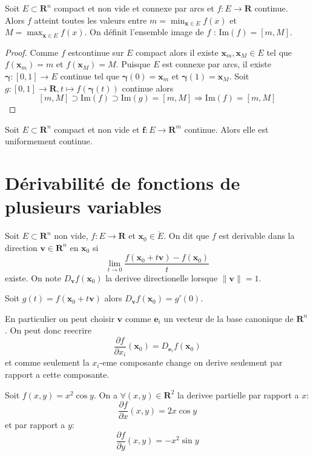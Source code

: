 \begin{theorem}
Soit $E\subset \mathbf{R}^{n}$ compact et non vide et connexe par arcs et $f:E\to \mathbf{R}$ continue. Alors $f$ atteint toutes les valeurs entre $m=\min_{\boldsymbol{x}\in E} f(x)$ et $M=\max_{\boldsymbol{x}\in E} f(x)$. On définit l'ensemble image de $f$ : $\mathrm{Im}(f)=[m,M]$.
\end{theorem}
\begin{proof}
Comme $f$ estcontinue sur $E$ compact alors il existe $\boldsymbol{x}_{m},\boldsymbol{x}_{M}\in E$ tel que $f(\boldsymbol{x}_{m})=m$ et $f(\boldsymbol{x}_{M})=M$. Puisque $E$ est connexe par arcs, il existe $\boldsymbol{\gamma}:[0,1]\to E$ continue tel que $\boldsymbol{\gamma}(0)=\boldsymbol{x}_{m}$ et $\boldsymbol{\gamma}(1)=\boldsymbol{x}_{M}$. Soit $g:[0,1]\to \mathbf{R}, t\mapsto f(\boldsymbol{\gamma}(t))$ continue alors $$[m,M]\supset \mathrm{Im}(f)\supset\mathrm{Im}(g)=[m,M]\Rightarrow \mathrm{Im}(f)=[m,M]$$
\end{proof}
\begin{theorem}
Soit $E\subset \mathbf{R}^{n}$ compact et non vide et $\boldsymbol{f}:E\to \mathbf{R}^{m}$ continue. Alors elle est uniformement continue.
\end{theorem}


\chapter{Dérivabilité de fonctions de plusieurs variables}

\begin{definition}
Soit $E\subset \mathbf{R}^{n}$ non vide, $f:E\to \mathbf{R}$ et $\boldsymbol{x}_{0}\in \mathring{E}$. On dit que $f$ est derivable dans la direction $\boldsymbol{v}\in \mathbf{R}^{n}$ en $\boldsymbol{x}_{0}$ si 
$$
\lim_{ t \to 0 } \frac{f(\boldsymbol{x}_{0}+t\boldsymbol{v})-f(\boldsymbol{x}_{0})}{t}
$$
existe. On note $D_{\boldsymbol{v}}f(\boldsymbol{x}_{0})$ la derivee directionelle lorsque $\lVert \boldsymbol{v} \rVert=1$.
\end{definition}
\begin{remark}
Soit $g(t)=f(\boldsymbol{x}_{0}+t\boldsymbol{v})$ alors $D_{\boldsymbol{v}}f(\boldsymbol{x}_{0})=g'(0)$.
\end{remark}

\begin{definition}
En particulier on peut choisir $\boldsymbol{v}$ comme $\boldsymbol{e}_{i}$ un vecteur de la base canonique de $\mathbf{R}^{n}$. On peut donc reecrire 
$$
\frac{ \partial f }{ \partial x_{i} }(\boldsymbol{x}_{0})=D_{\boldsymbol{e}_{i}}f(\boldsymbol{x}_{0})
$$
et comme seulement la $x_{i}$-eme composante change on derive seulement par rapport a cette composante.
\end{definition}
\begin{example}
Soit $f(x,y)=x^{2}\cos y$. On a $\forall (x,y)\in \mathbf{R}^{2}$ la derivee partielle par rapport a $x$:
$$
\frac{ \partial f }{ \partial x } (x,y)=2x\cos y
$$
et par rapport a $y$:
$$
\frac{ \partial f }{ \partial y } (x,y)=-x^{2}\sin y
$$\end{example}

